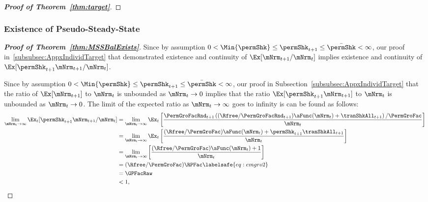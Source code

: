\documentclass[\econtexRoot/BufferStockTheory]{subfiles}
\begin{document}
\begin{proof}[\textbf{Proof of Theorem~\ref{thm:target}}]

\end{proof}
  
\subsubsection{Existence of Pseudo-Steady-State}\label{subsubsec:AppxPseudoSS}

\begin{proof}[\textbf{Proof of Theorem~\ref{thm:MSSBalExists}}]

Since by assumption $ 0 < \Min{\permShk} \leq \permShk_{t+1} \leq \bar{\permShk} < \infty$, our proof in~\ref{subsubsec:AppxIndividTarget} that demonstrated existence and continuity of $\Ex[\mNrm_{t+1}/\mNrm_{t}]$ implies existence and continuity of $\Ex[\permShk_{t+1}\mNrm_{t+1}/\mNrm_{t}]$.



Since by assumption $ 0 < \Min{\permShk} \leq \permShk_{t+1} \leq \bar{\permShk} < \infty$, our proof in Subsection~\ref{subsubsec:AppxIndividTarget} that the ratio of $\Ex[\mNrm_{t+1}]$ to $\mNrm_{t}$ is unbounded as $\mNrm_{t} \rightarrow 0$ implies that the ratio $\Ex[\permShk_{t+1}\mNrm_{t+1}]$ to $\mNrm_{t}$ is unbounded as $\mNrm_{t} \rightarrow 0$.
The limit of the expected ratio as $\mNrm_{t}\rightarrow \infty$ goes to infinity is can be found as follows:
%
\begin{equation}\begin{gathered}\begin{aligned}
  \lim_{\mNrm_{t} \rightarrow \infty} \Ex_{t}[\permShk_{t+1}\mNrm_{t+1}/\mNrm_{t}]  & =   
                                                                  \lim_{\mNrm_{t} \rightarrow \infty} 
                                                                  \Ex_{t}\left[\frac{\PermGroFacRnd_{t+1}\left((\Rfree/\PermGroFacRnd_{t+1})\aFunc(\mNrm_{t})+{\tranShkAll}_{t+1}\right)/\PermGroFac}{\mNrm_{t}}\right] \notag 
  \\   & =   \lim_{\mNrm_{t} \rightarrow \infty} \Ex_{t}\left[
         \frac{(\Rfree/\PermGroFac)\aFunc(\mNrm_{t})+\permShk_{t+1}{\tranShkAll}_{t+1}}{\mNrm_{t}}
         \right] \notag 
  \\   & =   \lim_{\mNrm_{t} \rightarrow \infty} \left[
         \frac{(\Rfree/\PermGroFac)\aFunc(\mNrm_{t})+1}{\mNrm_{t}}
         \right] \notag 
  \\  & = (\Rfree/\PermGroFac)\RPFac \labelsafe{eq:emgro2}
  \\  & = \GPFacRaw \notag
  \\  & < 1, \notag
\end{aligned}\end{gathered}\end{equation}


\end{proof}
\end{document}
